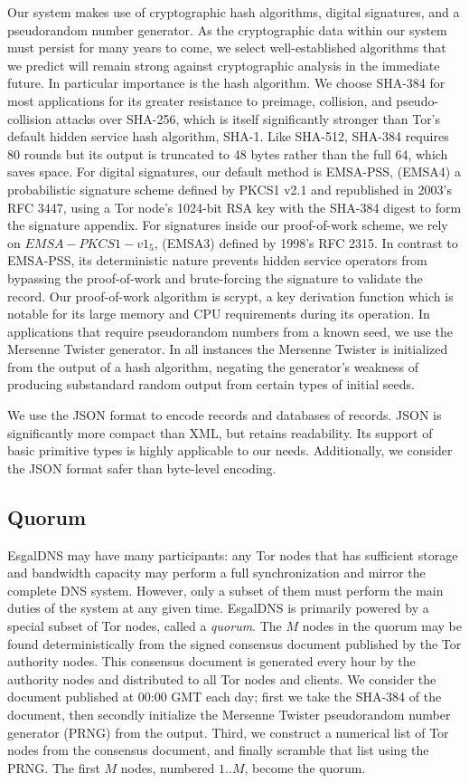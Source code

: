 Our system makes use of cryptographic hash algorithms, digital signatures, and a pseudorandom number generator. As the cryptographic data within our system must persist for many years to come, we select well-established algorithms that we predict will remain strong against cryptographic analysis in the immediate future. In particular importance is the hash algorithm. We choose SHA-384 for most applications for its greater resistance to preimage, collision, and pseudo-collision attacks over SHA-256, which is itself significantly stronger than Tor's default hidden service hash algorithm, SHA-1. Like SHA-512, SHA-384 requires 80 rounds but its output is truncated to 48 bytes rather than the full 64, which saves space. For digital signatures, our default method is EMSA-PSS, (EMSA4) a probabilistic signature scheme defined by PKCS1 v2.1 and republished in 2003's RFC 3447, using a Tor node's 1024-bit RSA key with the SHA-384 digest to form the signature appendix. For signatures inside our proof-of-work scheme, we rely on $EMSA-PKCS1-v1_5$, (EMSA3) defined by 1998's RFC 2315. In contrast to EMSA-PSS, its deterministic nature prevents hidden service operators from bypassing the proof-of-work and brute-forcing the signature to validate the record. Our proof-of-work algorithm is scrypt, a key derivation function which is notable for its large memory and CPU requirements during its operation. In applications that require pseudorandom numbers from a known seed, we use the Mersenne Twister generator. In all instances the Mersenne Twister is initialized from the output of a hash algorithm, negating the generator's weakness of producing substandard random output from certain types of initial seeds.

We use the JSON format to encode records and databases of records. JSON is significantly more compact than XML, but retains readability. Its support of basic primitive types is highly applicable to our needs. Additionally, we consider the JSON format safer than byte-level encoding.

\subsection{Quorum}

EsgalDNS may have many participants: any Tor nodes that has sufficient storage and bandwidth capacity may perform a full synchronization and mirror the complete DNS system. However, only a subset of them must perform the main duties of the system at any given time. EsgalDNS is primarily powered by a special subset of Tor nodes, called a \textit{quorum}. The $ M $ nodes in the quorum may be found deterministically from the signed consensus document published by the Tor authority nodes. This consensus document is generated every hour by the authority nodes and distributed to all Tor nodes and clients. We consider the document published at 00:00 GMT each day; first we take the SHA-384 of the document, then secondly initialize the Mersenne Twister pseudorandom number generator (PRNG) from the output. Third, we construct a numerical list of Tor nodes from the consensus document, and finally scramble that list using the PRNG. The first $ M $ nodes, numbered $ 1 .. M $, become the quorum.

